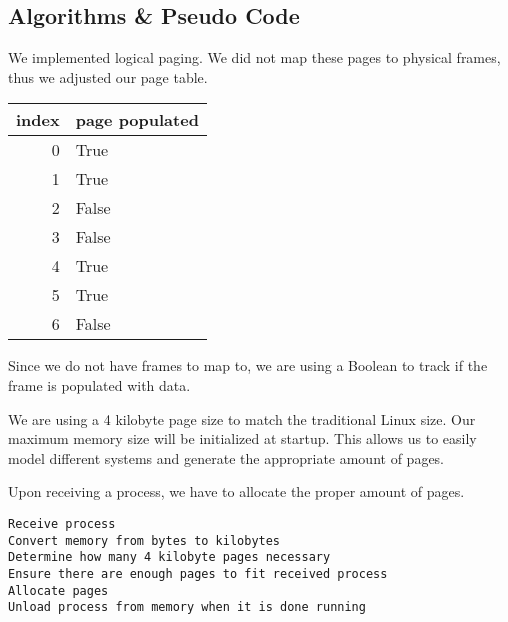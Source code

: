 \documentclass[12pt]{article}
\begin{document}
\subsection{Algorithms \& Pseudo Code}
We implemented logical paging. We did not map these pages to physical frames, thus we adjusted our page table.

\begin{center}

	\begin{tabular}{|r |  l |}
	\hline
	index & page populated \\\hline\hline
	0 & True\\\hline
	1 & True\\\hline
	2 & False \\\hline
	3 & False \\\hline
	4 & True \\\hline
	5 & True  \\\hline
	6 & False\\\hline
\end{tabular}
\end{center}

Since we do not have frames to map to, we are using a Boolean to track if the frame is populated with data. 

We are using a 4 kilobyte page size to match the traditional Linux size. Our maximum memory size will be initialized at startup. This allows us to easily model different systems and generate the appropriate amount of pages. 

Upon receiving a process, we have to allocate the proper amount of pages.

\singlespacing
\begin{lstlisting}
Receive process
Convert memory from bytes to kilobytes
Determine how many 4 kilobyte pages necessary
Ensure there are enough pages to fit received process
Allocate pages
Unload process from memory when it is done running
\end{lstlisting}
\doublespacing
\end{document}
